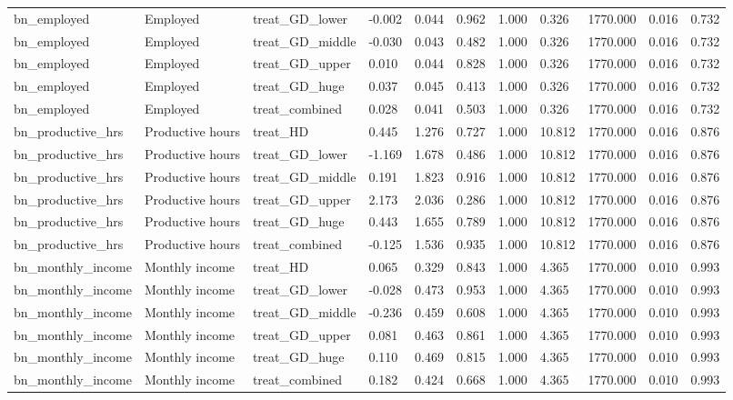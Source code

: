 \begin{tabular}{lllllllllll}
bn\_employed & Employed & treat\_GD\_lower & -0.002 & 0.044 & 0.962 & 1.000 & 0.326 & 1770.000 & 0.016 & 0.732 \\
bn\_employed & Employed & treat\_GD\_middle & -0.030 & 0.043 & 0.482 & 1.000 & 0.326 & 1770.000 & 0.016 & 0.732 \\
bn\_employed & Employed & treat\_GD\_upper & 0.010 & 0.044 & 0.828 & 1.000 & 0.326 & 1770.000 & 0.016 & 0.732 \\
bn\_employed & Employed & treat\_GD\_huge & 0.037 & 0.045 & 0.413 & 1.000 & 0.326 & 1770.000 & 0.016 & 0.732 \\
bn\_employed & Employed & treat\_combined & 0.028 & 0.041 & 0.503 & 1.000 & 0.326 & 1770.000 & 0.016 & 0.732 \\
bn\_productive\_hrs & Productive hours & treat\_HD & 0.445 & 1.276 & 0.727 & 1.000 & 10.812 & 1770.000 & 0.016 & 0.876 \\
bn\_productive\_hrs & Productive hours & treat\_GD\_lower & -1.169 & 1.678 & 0.486 & 1.000 & 10.812 & 1770.000 & 0.016 & 0.876 \\
bn\_productive\_hrs & Productive hours & treat\_GD\_middle & 0.191 & 1.823 & 0.916 & 1.000 & 10.812 & 1770.000 & 0.016 & 0.876 \\
bn\_productive\_hrs & Productive hours & treat\_GD\_upper & 2.173 & 2.036 & 0.286 & 1.000 & 10.812 & 1770.000 & 0.016 & 0.876 \\
bn\_productive\_hrs & Productive hours & treat\_GD\_huge & 0.443 & 1.655 & 0.789 & 1.000 & 10.812 & 1770.000 & 0.016 & 0.876 \\
bn\_productive\_hrs & Productive hours & treat\_combined & -0.125 & 1.536 & 0.935 & 1.000 & 10.812 & 1770.000 & 0.016 & 0.876 \\
bn\_monthly\_income & Monthly income & treat\_HD & 0.065 & 0.329 & 0.843 & 1.000 & 4.365 & 1770.000 & 0.010 & 0.993 \\
bn\_monthly\_income & Monthly income & treat\_GD\_lower & -0.028 & 0.473 & 0.953 & 1.000 & 4.365 & 1770.000 & 0.010 & 0.993 \\
bn\_monthly\_income & Monthly income & treat\_GD\_middle & -0.236 & 0.459 & 0.608 & 1.000 & 4.365 & 1770.000 & 0.010 & 0.993 \\
bn\_monthly\_income & Monthly income & treat\_GD\_upper & 0.081 & 0.463 & 0.861 & 1.000 & 4.365 & 1770.000 & 0.010 & 0.993 \\
bn\_monthly\_income & Monthly income & treat\_GD\_huge & 0.110 & 0.469 & 0.815 & 1.000 & 4.365 & 1770.000 & 0.010 & 0.993 \\
bn\_monthly\_income & Monthly income & treat\_combined & 0.182 & 0.424 & 0.668 & 1.000 & 4.365 & 1770.000 & 0.010 & 0.993 \\

\end{tabular}
